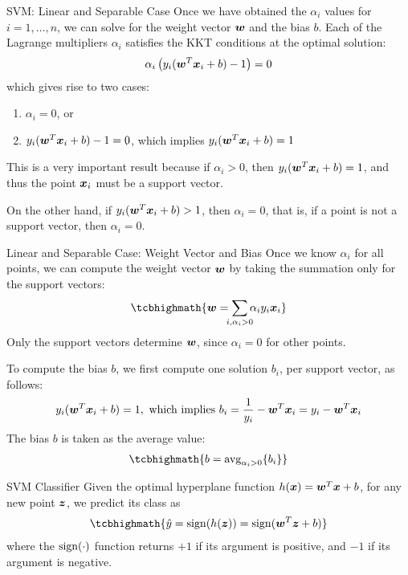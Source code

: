 \begin{frame}{SVM: Linear and Separable Case}
Once we have obtained the $\alpha_i$ values for $i=1,\ldots, n$,
we can solve for the weight vector ${\boldsymbol w}$ and the bias $b$. Each of the
Lagrange multipliers $\alpha_i$ satisfies the KKT conditions at the
optimal solution:
\begin{align*}
  \alpha_i \left(y_i ({\boldsymbol w}^T{\boldsymbol x}_i + b) - 1\right) = 0
\end{align*}
which gives rise to two cases:
\begin{enumerate}[(1)]
\item $\alpha_i = 0$, or
\item $y_i ({\boldsymbol w}^T{\boldsymbol x}_i + b) - 1 = 0$, which implies
  $y_i ({\boldsymbol w}^T{\boldsymbol x}_i + b) = 1$
\end{enumerate}

\medskip
This is a very important result because if $\alpha_i
> 0$, then $y_i ({\boldsymbol w}^T{\boldsymbol x}_i + b) = 1$, and thus the point ${\boldsymbol x}_i$
must be a support vector. 

\medskip
On the other hand, if $y_i ({\boldsymbol w}^T{\boldsymbol x}_i +
b) > 1$, then $\alpha_i = 0$, that is, if a point is not a support
vector, then $\alpha_i = 0$.
\end{frame}


\begin{frame}{Linear and Separable Case: Weight Vector and Bias}
Once we know $\alpha_i$ for all points, we can compute the weight
vector ${\boldsymbol w}$ by taking the
summation only for the support vectors:
\begin{align*}
\tcbhighmath{
    \bw = \dsum_{\mathclap{i, \alpha_i > 0}} \alpha_i y_i \bx_i
}
\end{align*}
Only the support vectors determine ${\boldsymbol w}$, since 
$\alpha_i=0$ for other points.

To compute the bias $b$, we f\/{i}rst compute one solution $b_i$, per
support vector, as follows:
\begin{align*}
  y_i ({\boldsymbol w}^T{\boldsymbol x}_i + b) = 1, \text{ which implies }
  b_i = {1 \over y_i} - {\boldsymbol w}^T{\boldsymbol x}_i = y_i - {\boldsymbol w}^T{\boldsymbol x}_i
\end{align*}
The bias $b$ is taken as the average value:
\begin{align*}
\tcbhighmath{
   b = \displaystyle \mbox{avg}_{\alpha_i > 0} \{ b_i\}
}
\end{align*}
\end{frame}



\begin{frame}{SVM Classif\/{i}er}
Given the optimal hyperplane function $h({\boldsymbol x}) = {\boldsymbol w}^T{\boldsymbol x} + b$,
for any new point ${\boldsymbol z}$, we predict its class as
\begin{align*}
\tcbhighmath{
  \hat{y}  =  \sign(h(\bz)) = \sign(\bw^T\bz + b)
}
\end{align*}
where the $\operatorname{sign}(\cdot)$ function returns $+1$ if its argument is positive, and
$-1$ if its argument is negative.
\end{frame}



